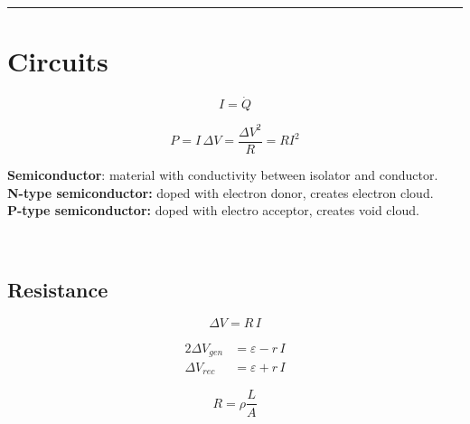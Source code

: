 \documentclass{form}
\begin{document}
\noindent\rule{\textwidth}{0.4pt}
\begin{minipage}[c]{0.10\textwidth}
	\section*{Circuits}
\end{minipage}
\begin{minipage}[c]{0.06\textwidth}
	\begin{equation*}
		I=\dot{Q}
	\end{equation*}
\end{minipage}
\begin{minipage}[c]{0.22\textwidth}
	\begin{equation*}
		P=I\,\Delta V=\frac{\Delta V^2}{R}=RI^2
	\end{equation*}
\end{minipage}
\begin{minipage}[c]{0.59\textwidth}
	\textbf{Semiconductor}: material with conductivity between isolator and conductor.\\
	\textbf{N-type semiconductor:} doped with electron donor, creates electron cloud.\\
	\textbf{P-type semiconductor:} doped with electro acceptor, creates void cloud.
\end{minipage}\\
\begin{minipage}[c]{0.15\textwidth}
	\subsection*{Resistance}
\end{minipage}
\begin{minipage}[c]{0.09\textwidth}
	\begin{equation*}
		\Delta V = R\,I
	\end{equation*}
\end{minipage}
\begin{minipage}[c]{0.14\textwidth}
	\begin{alignat*}{2}
		{\Delta V}_{gen} &= \varepsilon - r\,I \\
		{\Delta V}_{rec} &= \varepsilon + r\,I
	\end{alignat*}
\end{minipage}
\begin{minipage}[c]{0.09\textwidth}
	\begin{equation*}
		R = \rho \frac{L}{A}
	\end{equation*}
\end{minipage}
\end{document}
